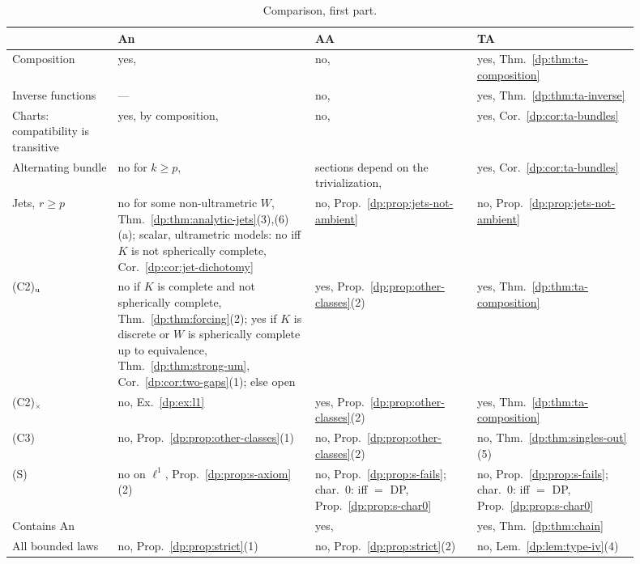 \documentclass[11pt]{amsart}
\theoremstyle{definition}
\theoremstyle{remark}
\numberwithin{equation}{section}
\theoremstyle{plain}
\theoremstyle{definition}
\theoremstyle{plain}
\begin{document}
\begin{table}[htbp]
\small
\caption{Comparison, first part.}\label{dp:tab:compare}
\begin{tabular}{@{}p{0.15\linewidth}p{0.29\linewidth}p{0.23\linewidth}p{0.23\linewidth}@{}}
 & An & AA & TA\\
\hline
Composition & yes, \cite[Proposition~14.26, proof, Step~1]{I} & no, \cite[Theorem~14.17]{I} & yes, Thm.~\ref{dp:thm:ta-composition}\\
Inverse functions & --- & no, \cite[Corollary~14.19(1)]{I} & yes, Thm.~\ref{dp:thm:ta-inverse}\\
Charts: compatibility is transitive & yes, by composition, \cite[Proposition~14.26, proof, Step~1]{I} & no, \cite[Corollary~14.19(3)]{I} & yes, Cor.~\ref{dp:cor:ta-bundles}\\
Alternating bundle & no for $k\ge p$, \cite[Theorem~7.2, Corollary~10.2]{I} & sections depend on the trivialization, \cite[Corollary~14.19(4)]{I} & yes, Cor.~\ref{dp:cor:ta-bundles}\\
Jets, $r\ge p$ & no for some non-ultrametric $W$, Thm.~\ref{dp:thm:analytic-jets}(3),(6)(a); scalar, ultrametric models: no iff $K$ is not spherically complete, Cor.~\ref{dp:cor:jet-dichotomy} & no, Prop.~\ref{dp:prop:jets-not-ambient} & no, Prop.~\ref{dp:prop:jets-not-ambient}\\
(C2)$_{\rm u}$ & no if $K$ is complete and not spherically complete, Thm.~\ref{dp:thm:forcing}(2); yes if $K$ is discrete or $W$ is spherically complete up to equivalence, Thm.~\ref{dp:thm:strong-um}, Cor.~\ref{dp:cor:two-gaps}(1); else open & yes, Prop.~\ref{dp:prop:other-classes}(2) & yes, Thm.~\ref{dp:thm:ta-composition}\\
(C2)$_\times$ & no, Ex.~\ref{dp:ex:l1} & yes, Prop.~\ref{dp:prop:other-classes}(2) & yes, Thm.~\ref{dp:thm:ta-composition}\\
(C3) & no, Prop.~\ref{dp:prop:other-classes}(1) & no, Prop.~\ref{dp:prop:other-classes}(2) & no, Thm.~\ref{dp:thm:singles-out}(5)\\
(S) & no on $\ell^1$, Prop.~\ref{dp:prop:s-axiom}(2) & no, Prop.~\ref{dp:prop:s-fails}; char.\ $0$: iff $=$ DP, Prop.~\ref{dp:prop:s-char0} & no, Prop.~\ref{dp:prop:s-fails}; char.\ $0$: iff $=$ DP, Prop.~\ref{dp:prop:s-char0}\\
Contains An & & yes, \cite[Definition~14.7]{I} & yes, Thm.~\ref{dp:thm:chain}\\
All bounded laws & no, Prop.~\ref{dp:prop:strict}(1) & no, Prop.~\ref{dp:prop:strict}(2) & no, Lem.~\ref{dp:lem:type-iv}(4)\\

\end{tabular}
\end{table}
\end{document}
